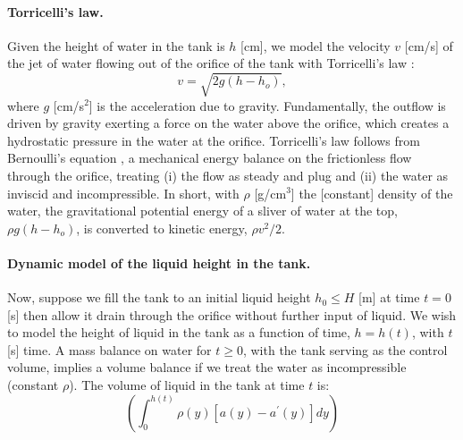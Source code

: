 \documentclass[openacc]{rsproca_new}%
\begin{document}
\paragraph{Torricelli's law.} Given the height of water in the tank is $h$ [cm], we model the velocity $v$ [cm/s] of the jet of water flowing out of the orifice of the tank with Torricelli's law \cite{d2021torricelli}:
\begin{equation}
	v =  \sqrt{2 g(h-h_o)}, \label{eq:Toricelli}
\end{equation} where $g$ [cm/s$^2$] is the acceleration due to gravity. 
Fundamentally, the outflow is driven by gravity exerting a force on the water above the orifice, which creates a hydrostatic pressure in the water at the orifice. 
Torricelli's law follows from Bernoulli's equation \cite{welty2020fundamentals}, a mechanical energy balance on the frictionless flow through the orifice, treating (i) the flow as steady and plug and (ii) the water as inviscid and incompressible. 
In short, with $\rho$ [g/cm$^3$] the [constant] density of the water, the gravitational potential energy of a sliver of water at the top, $\rho g(h-h_o)$, is converted to kinetic energy, $\rho v^2/2$.

\paragraph{Dynamic model of the liquid height in the tank.} Now, suppose we fill the tank to an initial liquid height $h_0 \leq H$ [m] at time $t=0$ [s] then allow it drain through the orifice without further input of liquid. We wish to model the height of liquid in the tank as a function of time, $h=h(t)$, with $t$ [s] time. 
A mass balance on water for $t\geq 0$, with the tank serving as the control volume, implies a volume balance if we treat the water as incompressible (constant $\rho$). The volume of liquid in the tank at time $t$ is:
\begin{equation}
	\left ( \int_0^{h(t)} \rho(y) [a(y) - a^\prime(y)]dy \right) 
\end{equation}
\end{document}
